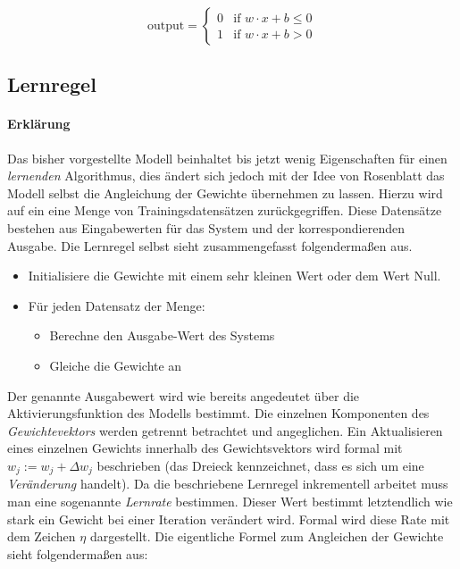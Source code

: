 \begin{equation} \label{eq:aktFkt3}
\mbox{output} =\begin{cases}
	0 & \mbox{if } w\cdot x + b \leq 0 \\
    1 & \mbox{if } w\cdot x + b > 0
  \end{cases}
\end{equation}



\subsection{Lernregel} \label{ss:lernregel}

\paragraph{Erklärung}

Das bisher vorgestellte Modell beinhaltet bis jetzt wenig Eigenschaften für einen \emph{lernenden} Algorithmus, dies ändert sich jedoch mit der Idee von Rosenblatt das Modell selbst die Angleichung der Gewichte übernehmen zu lassen. Hierzu wird auf ein eine Menge von Trainingsdatensätzen zurückgegriffen. 
Diese Datensätze bestehen aus Eingabewerten für das System und der korrespondierenden Ausgabe. Die Lernregel selbst sieht zusammengefasst folgendermaßen aus. 

\begin{minipage}{\textwidth}
\begin{itemize}
\item Initialisiere die Gewichte mit einem sehr kleinen Wert oder dem Wert Null. 
\item Für jeden Datensatz der Menge: 
\begin{itemize}
	\item Berechne den Ausgabe-Wert des Systems 
	\item Gleiche die Gewichte an 
\end{itemize}
\end{itemize}
\end{minipage}

\vspace{5 mm}

\label{sp:lernrate}
Der genannte Ausgabewert wird wie bereits angedeutet über die Aktivierungsfunktion des Modells bestimmt. Die einzelnen Komponenten des \emph{Gewichtevektors} werden getrennt betrachtet und angeglichen. Ein Aktualisieren eines einzelnen Gewichts innerhalb des Gewichtsvektors wird formal mit $w_j := w_j + \Delta w_j$ beschrieben (das Dreieck kennzeichnet, dass es sich um eine \emph{Veränderung} handelt). Da die beschriebene Lernregel inkrementell arbeitet muss man eine sogenannte \emph{Lernrate} bestimmen. Dieser Wert bestimmt letztendlich wie stark ein Gewicht bei einer Iteration verändert wird. Formal wird diese Rate mit dem Zeichen $\eta$ dargestellt. Die eigentliche Formel zum Angleichen der Gewichte sieht folgendermaßen aus: 

